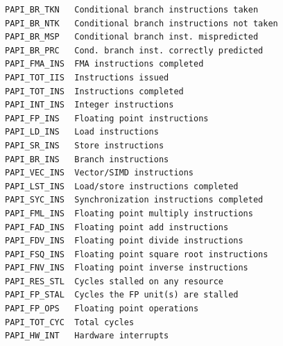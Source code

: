 \begin{scriptsize}
\begin{verbatim}
PAPI_BR_TKN   Conditional branch instructions taken               
PAPI_BR_NTK   Conditional branch instructions not taken           
PAPI_BR_MSP   Conditional branch inst. mispredicted        
PAPI_BR_PRC   Cond. branch inst. correctly predicted 
PAPI_FMA_INS  FMA instructions completed                          
PAPI_TOT_IIS  Instructions issued                                 
PAPI_TOT_INS  Instructions completed                              
PAPI_INT_INS  Integer instructions                                
PAPI_FP_INS   Floating point instructions                         
PAPI_LD_INS   Load instructions                                   
PAPI_SR_INS   Store instructions                                  
PAPI_BR_INS   Branch instructions                                 
PAPI_VEC_INS  Vector/SIMD instructions                            
PAPI_LST_INS  Load/store instructions completed                   
PAPI_SYC_INS  Synchronization instructions completed              
PAPI_FML_INS  Floating point multiply instructions                
PAPI_FAD_INS  Floating point add instructions                     
PAPI_FDV_INS  Floating point divide instructions                  
PAPI_FSQ_INS  Floating point square root instructions             
PAPI_FNV_INS  Floating point inverse instructions                 
PAPI_RES_STL  Cycles stalled on any resource    
PAPI_FP_STAL  Cycles the FP unit(s) are stalled 
PAPI_FP_OPS   Floating point operations         
PAPI_TOT_CYC  Total cycles                      
PAPI_HW_INT   Hardware interrupts               
\end{verbatim} 
\end{scriptsize}

\vfill

